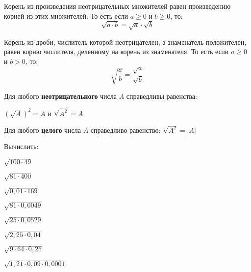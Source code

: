 \begin{class}[number=3]
	\begin{definit}
		Корень из произведения неотрицательных множителей равен произведению корней из этих множителей. То есть если \( a\ge0 \) и \( b\ge0 \), то: \[ \sqrt{a \cdot b}=\sqrt{a}\cdot\sqrt{b} \]
	\end{definit}
	\begin{definit}
		Корень из дроби,  числитель которой неотрицателен, а знаменатель положителен, равен корню числителя, деленному на корень из знаменателя. То есть если \( a\ge0 \) и \( b>0 \), то: \[ \sqrt{\dfrac{a}{b}}=\dfrac{\sqrt{a}}{\sqrt{b}} \]
	\end{definit}
	\begin{definit}
		Для любого \textbf{неотрицательного} числа \( A \) справедливы равенства:
		\begin{center}
			\( \left( \sqrt{A} \right)^2=A \) и \( \sqrt{A^2}=A \)
		\end{center}
	\end{definit}
	\begin{definit}
		Для любого \textbf{целого} числа \( A \) справедливо равенство: \( \sqrt{A^2}=|A| \)
	\end{definit}
	\begin{listofex}
		\item Вычислить:
		\begin{enumcols}[itemcolumns=3]
			\item \( \sqrt{100\cdot49} \)
			\item \( \sqrt{81\cdot400} \)
			\item \( \sqrt{0,01\cdot169} \)
			\item \( \sqrt{81\cdot0,0049} \)
			\item \( \sqrt{25\cdot0,0529} \)
			\item \( \sqrt{2,25\cdot0,04} \)
			\item \( \sqrt{9\cdot64\cdot0,25} \)
			\item \( \sqrt{1,21\cdot0,09\cdot0,0001} \)
			

\end{enumcols}
\end{listofex}
\end{class}
